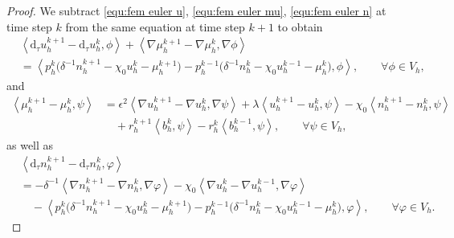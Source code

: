\documentclass[11pt, reqno]{amsart}
\theoremstyle{definition}
\numberwithin{equation}{section}
\newcommand{\dtt}{\mathrm{d}_\tau}
\newcommand{\inpro}[2]{\left\langle#1,#2\right\rangle}
\begin{document}
\begin{proof}
We subtract \eqref{equ:fem euler u}, \eqref{equ:fem euler mu}, \eqref{equ:fem euler n} at time step $k$ from the same equation at time step $k+1$ to obtain
\begin{align}
	\label{equ:u k1 min u k}
	&\inpro{\dtt u_h^{k+1}-\dtt u_h^k}{\phi}
	+
	\inpro{\nabla \mu_h^{k+1}-\nabla \mu_h^k}{\nabla \phi}
	\nonumber\\
	&=
	\inpro{p_h^k \big(\delta^{-1} n_h^{k+1}-\chi_0 u_h^k - \mu_h^{k+1}\big)- p_h^{k-1} \big(\delta^{-1} n_h^k-\chi_0 u_h^{k-1} - \mu_h^k\big)}{\phi}, \qquad \forall \phi \in V_h,
\end{align}
and
\begin{align}
	\label{equ:mu k1 min mu k}
	\inpro{\mu_h^{k+1}-\mu_h^k}{\psi}
	&=
	\epsilon^2 \inpro{\nabla u_h^{k+1}-\nabla u_h^k}{\nabla \psi}
	+
	\lambda \inpro{u_h^{k+1}-u_h^k}{\psi}
	-
	\chi_0 \inpro{n_h^{k+1}-n_h^k}{\psi}
	\nonumber\\
	&\quad
	+
	r_h^{k+1} \inpro{b_h^k}{\psi}
	-
	r_h^k \inpro{b_h^{k-1}}{\psi}
	, \qquad \forall \psi\in V_h,
\end{align}
as well as
\begin{align}\label{equ:n k1 min n}
	&\inpro{\dtt n_h^{k+1} -\dtt n_h^k}{\varphi}
	\nonumber\\
	&=
	-
	\delta^{-1} \inpro{\nabla n_h^{k+1}-\nabla n_h^k}{\nabla \varphi}
	-
	\chi_0 \inpro{\nabla u_h^k-\nabla u_h^{k-1}}{\nabla \varphi}
	\nonumber\\
	&\quad
	-
	\inpro{p_h^k \big(\delta^{-1} n_h^{k+1}-\chi_0 u_h^k - \mu_h^{k+1}\big)- p_h^{k-1}  \big(\delta^{-1} n_h^k-\chi_0 u_h^{k-1} - \mu_h^k\big)}{\varphi}, \qquad \forall \varphi\in V_h.
\end{align}




\end{proof}
\end{document}
